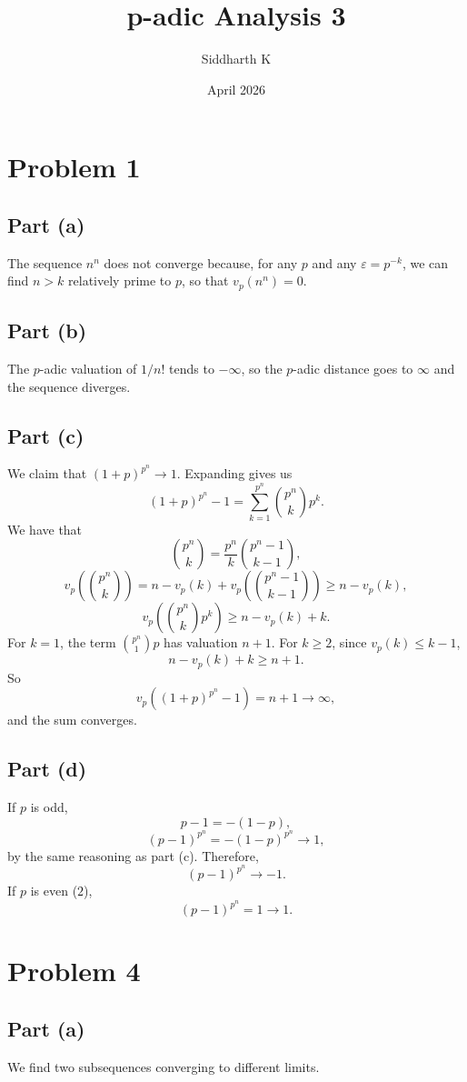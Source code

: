 \documentclass{article}
\title{p-adic Analysis 3}
\author{Siddharth K}
\date{April 2026}
\newcommand{\bigp}[1]{\left(#1\right)}
\newcommand{\eps}{\varepsilon}
\begin{document}
\maketitle

\section*{Problem 1}
\subsection*{Part (a)}
The sequence $n^n$ does not converge because, for any $p$ and any $\eps = p^{-k}$, we can find $n > k$ relatively prime to $p$, so that $v_p(n^n) = 0$.

\subsection*{Part (b)}
The $p$-adic valuation of $1/n!$ tends to $-\infty$, so the $p$-adic distance goes to $\infty$ and the sequence diverges.

\subsection*{Part (c)}
We claim that $(1 + p)^{p^n} \to 1$. Expanding gives us
$$(1 + p)^{p^n} - 1 = \sum_{k = 1}^{p^n} \binom{p^n}{k}p^k.$$
We have that
$$\binom{p^n}{k} = \frac{p^n}{k}\binom{p^n - 1}{k - 1},$$
$$v_p\bigp{\binom{p^n}{k}} = n - v_p(k) + v_p\bigp{\binom{p^n - 1}{k - 1}} \ge n - v_p(k),$$
$$v_p\bigp{\binom{p^n}{k}p^k} \ge n - v_p(k) + k.$$
For $k = 1$, the term $\binom{p^n}{1}p$ has valuation $n + 1$. For $k \ge 2$, since $v_p(k) \le k - 1$,
$$n - v_p(k) + k \ge n + 1.$$
So
$$v_p((1 + p)^{p^n} - 1) = n + 1 \to \infty,$$
and the sum converges.

\subsection*{Part (d)}
If $p$ is odd,
$$p - 1 = -(1 - p),$$
$$(p - 1)^{p^n} = -(1 - p)^{p^n} \to 1,$$
by the same reasoning as part (c). Therefore,
$$(p - 1)^{p^n} \to -1.$$
If $p$ is even ($2$),
$$(p - 1)^{p^n} = 1 \to 1.$$

\section*{Problem 4}
\subsection*{Part (a)}
We find two subsequences converging to different limits.
\end{document}
